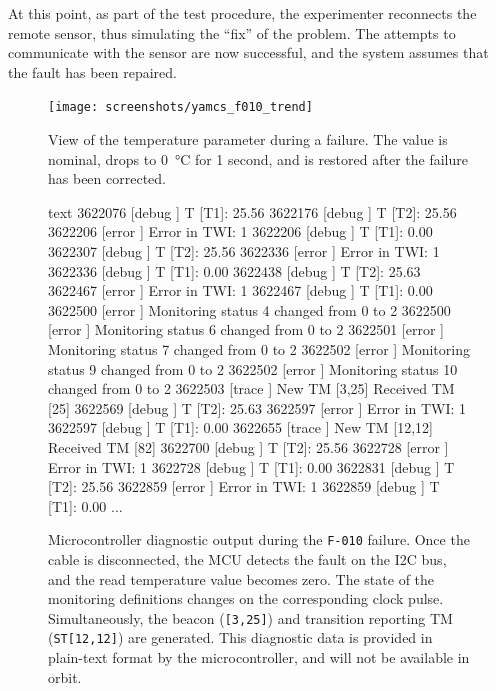 \documentclass[a4paper,nobib]{tufte-book}
\begin{document}
At this point, as part of the test procedure, the experimenter reconnects the remote sensor, thus simulating the ``fix'' of the problem. The attempts to communicate with the sensor are now successful, and the system assumes that the fault has been repaired.
	
\begin{figure}[h]
		\centering
		\texttt{[image: screenshots/yamcs\_f010\_trend]}
		\caption[View of the temperature parameter during a failure]{View of the temperature parameter during a failure. The value is nominal, drops to \SI{0}{\celsius} for 1 second, and is restored after the failure has been corrected.}
		\label{fig:yamcsf010trend}
\end{figure}

\begin{figure}
	\begin{cminted}{text}
3622076 [debug  ] T [T1]: 25.56
3622176 [debug  ] T [T2]: 25.56
3622206 [error  ] Error in TWI: 1
3622206 [debug  ] T [T1]: 0.00
3622307 [debug  ] T [T2]: 25.56
3622336 [error  ] Error in TWI: 1
3622336 [debug  ] T [T1]: 0.00
3622438 [debug  ] T [T2]: 25.63
3622467 [error  ] Error in TWI: 1
3622467 [debug  ] T [T1]: 0.00
3622500 [error  ] Monitoring status 4 changed from 0 to 2
3622500 [error  ] Monitoring status 6 changed from 0 to 2
3622501 [error  ] Monitoring status 7 changed from 0 to 2
3622502 [error  ] Monitoring status 9 changed from 0 to 2
3622502 [error  ] Monitoring status 10 changed from 0 to 2
3622503 [trace  ] New TM [3,25]
Received TM [25]
3622569 [debug  ] T [T2]: 25.63
3622597 [error  ] Error in TWI: 1
3622597 [debug  ] T [T1]: 0.00
3622655 [trace  ] New TM [12,12]
Received TM [82]
3622700 [debug  ] T [T2]: 25.56
3622728 [error  ] Error in TWI: 1
3622728 [debug  ] T [T1]: 0.00
3622831 [debug  ] T [T2]: 25.56
3622859 [error  ] Error in TWI: 1
3622859 [debug  ] T [T1]: 0.00
...
	\end{cminted}
	\caption[Microcontroller diagnostic output during the \texttt{F-010} failure]{Microcontroller diagnostic output during the \texttt{F-010} failure. Once the cable is disconnected, the \acs{MCU} detects the fault on the \acs{I2C} bus, and the read temperature value becomes zero. The state of the monitoring definitions changes on the corresponding clock pulse. Simultaneously, the beacon (\texttt{[3,25]}) and transition reporting \acs{TM} (\texttt{ST[12,12]}) are generated. This diagnostic data is provided in plain-text format by the microcontroller, and will not be available in orbit.}
\end{figure}
\end{document}
